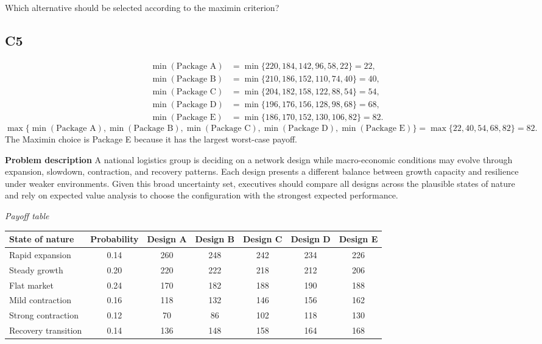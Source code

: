 \begin{ExamProblems}
		Which alternative should be selected according to the maximin criterion?

		\subsection*{C5}
			\[
			\begin{aligned}
			\min(\text{Package A}) &= \min\{220,184,142,96,58,22\} = 22,\\
			\min(\text{Package B}) &= \min\{210,186,152,110,74,40\} = 40,\\
			\min(\text{Package C}) &= \min\{204,182,158,122,88,54\} = 54,\\
			\min(\text{Package D}) &= \min\{196,176,156,128,98,68\} = 68,\\
			\min(\text{Package E}) &= \min\{186,170,152,130,106,82\} = 82.
			\end{aligned}
			\]
			\[
			\max\{\min(\text{Package A}), \min(\text{Package B}), \min(\text{Package C}), \min(\text{Package D}), \min(\text{Package E})\}
			= \max\{22, 40, 54, 68, 82\}
			= 82.
			\]
			The Maximin choice is Package E because it has the largest worst-case payoff.
		\item
		\textbf{Problem description}
		A national logistics group is deciding on a network design while macro-economic conditions may evolve through expansion, slowdown, contraction, and recovery patterns. Each design presents a different balance between growth capacity and resilience under weaker environments. Given this broad uncertainty set, executives should compare all designs across the plausible states of nature and rely on expected value analysis to choose the configuration with the strongest expected performance.

		\begin{center}
			\textit{Payoff table}
			\begin{tabular}{l c c c c c c}
				\toprule
				State of nature & Probability & Design A & Design B & Design C & Design D & Design E \\
				\midrule
				Rapid expansion & 0.14 & 260 & 248 & 242 & 234 & 226 \\
				Steady growth & 0.20 & 220 & 222 & 218 & 212 & 206 \\
				Flat market & 0.24 & 170 & 182 & 188 & 190 & 188 \\
				Mild contraction & 0.16 & 118 & 132 & 146 & 156 & 162 \\
				Strong contraction & 0.12 & 70 & 86 & 102 & 118 & 130 \\
				Recovery transition & 0.14 & 136 & 148 & 158 & 164 & 168 \\
				\bottomrule
			\end{tabular}
		\end{center}


\end{ExamProblems}
